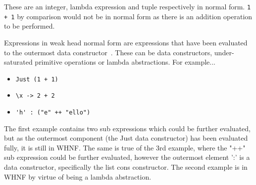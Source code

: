 These are an integer, lambda expression and tuple respectively in normal form. \verb!1 + 1!
by comparison would not be in normal form as there is an addition operation to
be performed.

Expressions in weak head normal form are expressions that have been evaluated
to the outermost data constructor~\cite[pp.198]{SPJ}. These can be data constructors, under-saturated
primitive operations or lambda abstractions. For example...
\begin{itemize}
	\item \verb!Just (1 + 1)!
	\item \verb!\x -> 2 + 2!
	\item \verb!'h' : ("e" ++ "ello")!
\end{itemize}
The first example contains two sub expressions which could be further evaluated,
but as the outermost component (the Just data constructor) has been evaluated 
fully, it is still in WHNF. The same is true of the 3rd example, where the "++"
sub expression could be further evaluated, however the outermost element
':' is a data constructor, specifically the list cons constructor. The second
example is in WHNF by virtue of being a lambda abstraction.

